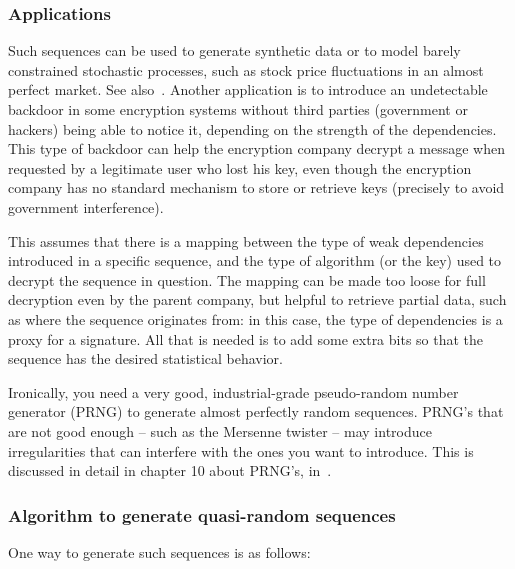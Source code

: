 \documentclass[oneside,10pt]{book}
\begin{document}
\subsubsection{Applications}

Such sequences can be used to generate \textcolor{index}{synthetic data}  or to model barely constrained stochastic processes, such as stock price fluctuations in an almost perfect market. See also~\cite{pac203}. Another application is  
 to introduce an undetectable backdoor in some encryption systems without third parties (government or hackers) being able to notice it, depending on the strength of the dependencies. This type of backdoor can help the encryption company decrypt a message when requested by a 
 legitimate user who lost his key, even though the encryption company has no standard mechanism to store or retrieve keys (precisely to avoid government interference). 

This assumes that there is a mapping between the  type of weak dependencies introduced in a specific sequence, and the 
 type of algorithm (or the key) used to decrypt the sequence in question. The mapping can be made too loose for full decryption even by the parent company, but helpful to retrieve partial data, such as where the sequence originates from: in this case, the type of dependencies is a proxy for a signature. All that is needed is to add some extra bits so that the sequence has the desired statistical behavior.

Ironically, you need a very good, industrial-grade \textcolor{index}{pseudo-random number generator} (PRNG) to generate almost perfectly random sequences. PRNG's that are not good enough -- such as the \textcolor{index}{Mersenne twister} -- may introduce irregularities that can interfere with the ones you want to introduce. This is discussed 
 in detail in chapter 10 about PRNG's, in~\cite{vgsynthetic}.

\subsubsection{Algorithm to generate quasi-random sequences}\label{qrrnd}

One way to generate such sequences is as follows: \vspace{1ex}
\end{document}
